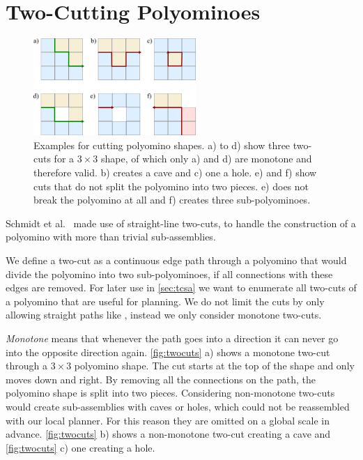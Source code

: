 \section{Two-Cutting Polyominoes}
\label{sec:twocutting}

\begin{figure}
	\centering
	\includegraphics[width=0.55\textwidth]{figures/twocuts.pdf}
	\caption[Different cuts for polyomino shapes]{Examples for cutting polyomino shapes. a) to d) show three two-cuts for a $3\times3$ shape, of which only a) and d) are monotone and therefore valid. b) creates a cave and c) one a hole. e) and f) show cuts that do not split the polyomino into two pieces. e) does not break the polyomino at all and f) creates three sub-polyominoes.}
	\label{fig:twocuts}
\end{figure}

Schmidt et al.\ \cite{Schmidt2018} made use of straight-line two-cuts, to handle the construction of a polyomino with more than trivial sub-assemblies.

We define a two-cut as a continuous edge path through a polyomino that would divide the polyomino into two sub-polyominoes, if all connections with these edges are removed.
For later use in \autoref{sec:tcsa} we want to enumerate all two-cuts of a polyomino that are useful for planning.
We do not limit the cuts by only allowing straight paths like \cite{Schmidt2018}, instead we only consider monotone two-cuts.

\textit{Monotone} means that whenever the path goes into a direction it can never go into the opposite direction again.
\autoref{fig:twocuts} a) shows a monotone two-cut through a $3\times3$ polyomino shape.
The cut starts at the top of the shape and only moves down and right.
By removing all the connections on the path, the polyomino shape is split into two pieces.
Considering non-monotone two-cuts would create sub-assemblies with caves or holes, which could not be reassembled with our local planner.
For this reason they are omitted on a global scale in advance.
\autoref{fig:twocuts} b) shows a non-monotone two-cut creating a cave and \autoref{fig:twocuts} c) one creating a hole.

